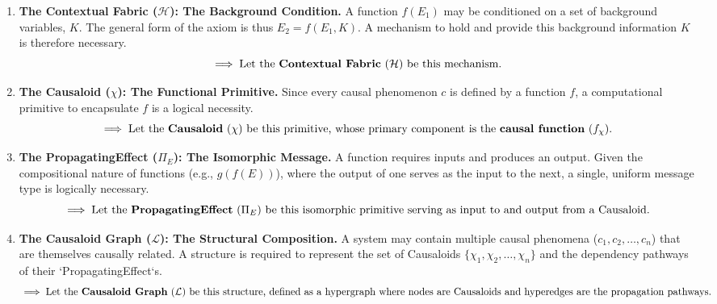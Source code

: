\begin{enumerate}
    \item \textbf{The Contextual Fabric ($\mathcal{H}$): The Background Condition.}
    A function $f(E_1)$ may be conditioned on a set of background variables, $K$. The general form of the axiom is thus $E_2 = f(E_1, K)$. 
    A mechanism to hold and provide this background information $K$ is therefore necessary.
    \begin{equation*}
        \implies \text{Let the \textbf{Contextual Fabric} ($\mathcal{H}$) be this mechanism.}
    \end{equation*}
    
    \item \textbf{The Causaloid ($\chi$): The Functional Primitive.}
    Since every causal phenomenon $c$ is defined by a function $f$, a computational primitive to encapsulate $f$ is a logical necessity.
    \begin{equation*}
        \implies \text{Let the \textbf{Causaloid} ($\chi$) be this primitive, whose primary component is the \textbf{causal function} ($f_\chi$).}
    \end{equation*}

    \item \textbf{The PropagatingEffect ($\Pi_E$): The Isomorphic Message.}
    A function requires inputs and produces an output. Given the compositional nature of functions (e.g., $g(f(E))$), where the output of one serves as the input to the next, a single, uniform message type is logically necessary.
    \begin{equation*}
        \implies \text{Let the \textbf{PropagatingEffect} ($\Pi_E$) be this isomorphic primitive serving as input to and output from a Causaloid.}
    \end{equation*}

    \item \textbf{The Causaloid Graph ($\mathcal{L}$): The Structural Composition.}
    A system may contain multiple causal phenomena ($c_1, c_2, \dots, c_n$) that are themselves causally related. A structure is required to represent the set of Causaloids $\{\chi_1, \chi_2, \dots, \chi_n\}$ and the dependency pathways of their `PropagatingEffect`s.
    \begin{equation*}
        \implies \text{Let the \textbf{Causaloid Graph} ($\mathcal{L}$) be this structure, defined as a hypergraph where nodes are Causaloids and hyperedges are the propagation pathways.}
    \end{equation*}

\end{enumerate}

